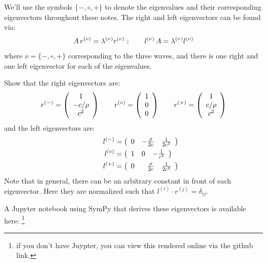 We'll use the symbols $\{-,\circ,+\}$ to denote the eigenvalues and their
corresponding eigenvectors throughout these notes.
%
The right and left eigenvectors can be found via:
\begin{equation}
A \, r^{(\nu)} = \lambda^{(\nu)} r^{(\nu)} \; ;
\qquad
l^{(\nu)} \, A  = \lambda^{(\nu)} l^{(\nu)}
\end{equation}
where $\nu = \{-,\circ,+\}$ corresponding to the three waves, and
there is one right and one left eigenvector for each of the eigenvalues.
%
\begin{exercise}
{
Show that the right eigenvectors are:
\begin{equation}
\label{eq:euler:primRevs}
r^\evm = \left ( \begin{array}{c} 1 \\ -c/\rho \\ c^2 \end{array} \right )
%
\qquad
r^\evz = \left ( \begin{array}{c} 1 \\ 0 \\ 0  \end{array} \right )
%
\qquad
r^\evp = \left ( \begin{array}{c} 1 \\ c/\rho \\ c^2 \end{array} \right )
\end{equation}
and the left eigenvectors are:
\begin{align}
l^\evm &= \left ( \begin{array}{ccc} 0 & -\frac{\rho}{2c} & \frac{1}{2c^2}
                  \end{array} \right ) \\
%
\qquad
l^\evz &= \left ( \begin{array}{ccc} 1 & 0 & -\frac{1}{c^2}  \end{array} \right ) \\
%
\qquad
l^\evp &= \left ( \begin{array}{ccc} 0 & \phantom{+}\frac{\rho}{2c} & \frac{1}{2c^2} \end{array} \right )
\end{align}
Note that in general, there can be an arbitrary constant in front of each
eigenvector.  Here they are normalized such that
$l^{(i)} \cdot r^{(j)} = \delta_{ij}$.
}
\end{exercise}
A {\sf Jupyter} notebook using {\sf SymPy} that derives these
eigenvectors is available here:
\footnote{if you don't have {\sf Juypter}, you can view this rendered online via the github link.}

